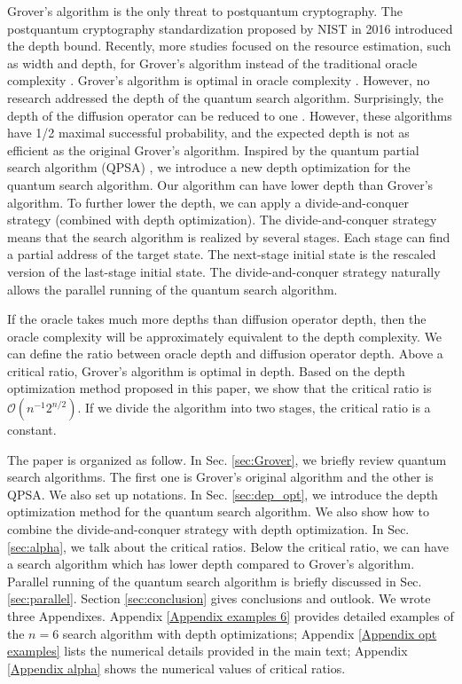 \documentclass[%
 twocolumn,
 10pt,
 superscriptaddress,
 longbibliography,
 amsmath,amssymb,
 aps,
 pra,
floatfix,
]{revtex4-1}
\begin{document}
Grover's algorithm is the only threat to postquantum cryptography. The postquantum cryptography standardization proposed by NIST in 2016 introduced the depth bound. Recently, more studies focused on the resource estimation, such as width and depth, for Grover's algorithm instead of the traditional oracle complexity \cite{KHJ18,JNRV19}. Grover's algorithm is optimal in oracle complexity \cite{BBHT98,Zalka99}. However, no research addressed the depth of the quantum search algorithm. Surprisingly, the depth of the diffusion operator can be reduced to one \cite{Kato05,JRW17}. However, these algorithms have 1/2 maximal successful probability, and the expected depth is not as efficient as the original Grover's algorithm. Inspired by the quantum partial search algorithm (QPSA) \cite{GR05,KG06,Korepin05,KL06}, we introduce a new depth optimization for the quantum search algorithm. Our algorithm can have lower depth than Grover's algorithm. To further lower the depth, we can apply a divide-and-conquer strategy (combined with depth optimization). The divide-and-conquer strategy means that the search algorithm is realized by several stages. Each stage can find a partial address of the target state. The next-stage initial state is the rescaled version of the last-stage initial state. The divide-and-conquer strategy naturally allows the parallel running of the quantum search algorithm. 

If the oracle takes much more depths than diffusion operator depth, then the oracle complexity will be approximately equivalent to the depth complexity. We can define the ratio between oracle depth and diffusion operator depth. Above a critical ratio, Grover's algorithm is optimal in depth. Based on the depth optimization method proposed in this paper, we show that the critical ratio is $\mathcal O(n^{-1}2^{n/2})$. If we divide the algorithm into two stages, the critical ratio is a constant. 

The paper is organized as follow. In Sec. \ref{sec:Grover}, we briefly review  quantum search algorithms. The first one is Grover's original algorithm and the other is QPSA. We also set up  notations. In Sec. \ref{sec:dep_opt}, we introduce the depth optimization method for the quantum search algorithm. We also show how to combine the divide-and-conquer strategy with depth optimization. In Sec. \ref{sec:alpha}, we talk about the critical ratios. Below the critical ratio, we can have a search algorithm which has lower depth compared to Grover's algorithm. Parallel running of the quantum search algorithm is briefly discussed in Sec. \ref{sec:parallel}. Section \ref{sec:conclusion} gives conclusions and outlook. We wrote three Appendixes. Appendix \ref{Appendix examples 6} provides detailed examples of the $n=6$ search algorithm with depth optimizations; Appendix \ref{Appendix opt examples} lists the numerical details provided in the main text; Appendix \ref{Appendix alpha} shows the numerical values of critical ratios. 
\end{document}
